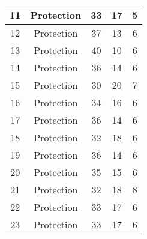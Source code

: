 \documentclass[results.tex]{subfiles}
\begin{document}
\begin{center}
\begin{tabular}{| c || c | c | c | c |}
            \hline
            11                      & Protection                   & 33                     & 17                      & 5                    \\
            \hline
            12                      & Protection                   & 37                     & 13                      & 6                    \\
            \hline
            13                      & Protection                   & 40                     & 10                      & 6                    \\
            \hline
            14                      & Protection                   & 36                     & 14                      & 6                    \\
            \hline
            15                      & Protection                   & 30                     & 20                      & 7                    \\
            \hline
            16                      & Protection                   & 34                     & 16                      & 6                    \\
            \hline
            17                      & Protection                   & 36                     & 14                      & 6                    \\
            \hline
            18                      & Protection                   & 32                     & 18                      & 6                    \\
            \hline
            19                      & Protection                   & 36                     & 14                      & 6                    \\
            \hline
            20                      & Protection                   & 35                     & 15                      & 6                    \\
            \hline
            21                      & Protection                   & 32                     & 18                      & 8                    \\
            \hline
            22                      & Protection                   & 33                     & 17                      & 6                    \\
            \hline
            23                      & Protection                   & 33                     & 17                      & 6                    \\

\end{tabular}
\end{center}
\end{document}
